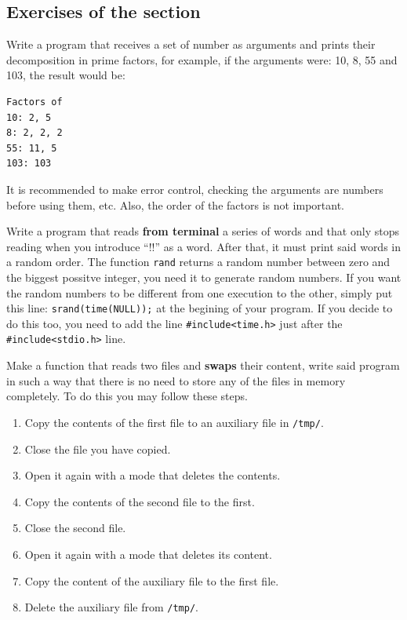 \documentclass[a4paper]{article}
\begin{document}
\subsection{Exercises of the section}
\begin{exercises}[resume*]
\item Write a program that receives a set of number as arguments and prints
their decomposition in prime factors, for example, if the arguments were:
10, 8, 55 and 103, the result would be:

\noindent
\begin{minipage}[H]{\linewidth}
\mbox{}
\begin{verbatim}
Factors of
10: 2, 5
8: 2, 2, 2
55: 11, 5
103: 103
\end{verbatim}
\end{minipage}

It is recommended to make error control, checking the arguments are numbers
before using them, etc. Also, the order of the factors is not important.
\item Write a program that reads \textbf{from terminal} a series of words and
that only stops reading when you introduce ``!!'' as a word. After that, it
must print said words in a random order. The function \verb!rand! returns a
random number between zero and the biggest possitve integer, you need it to
generate random numbers. If you want the random numbers to be different from
one execution to the other, simply put this line: \verb!srand(time(NULL));! at
the begining of your program. If you decide to do this too, you need to add
the line \verb!#include<time.h>! just after the \verb!#include<stdio.h>! line.

\item Make a function that reads two files and \textbf{swaps} their content,
write said program in such a way that there is no need to store any of the files
in memory completely. To do this you may follow these steps.
\begin{enumerate}
    \item Copy the contents of the first file to an auxiliary file in
    \verb!/tmp/!.
    \item Close the file you have copied.
    \item Open it again with a mode that deletes the contents.
    \item Copy the contents of the second file to the first.
    \item Close the second file.
    \item Open it again with a mode that deletes its content.
    \item Copy the content of the auxiliary file to the first file.
    \item Delete the auxiliary file from \verb!/tmp/!.
\end{enumerate}


\end{exercises}
\end{document}
